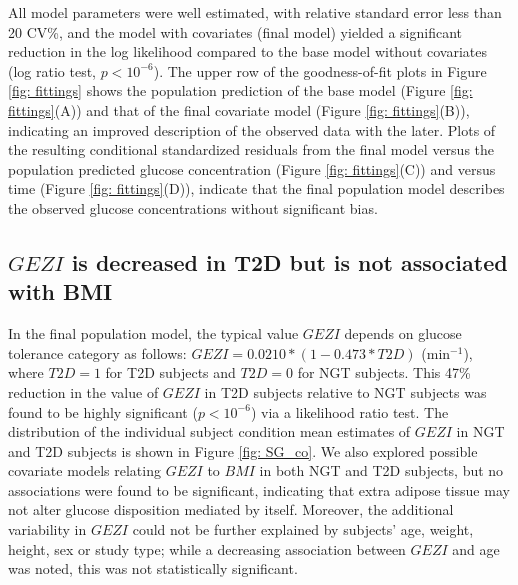 \documentclass[utf8]{frontiersSCNS} %
\begin{document}
All model parameters were well estimated, with relative standard error less than 20 CV\%, and the model with covariates (final model) yielded a significant reduction in the log likelihood compared to the base model without covariates (log ratio test, $p<10^{-6}$). The upper row of the goodness-of-fit plots in Figure \ref{fig: fittings} shows the population prediction of the base model (Figure \ref{fig: fittings}(A)) and that of the final covariate model (Figure \ref{fig: fittings}(B)), indicating an improved description of the observed data with the later. Plots of the resulting conditional standardized residuals from the final model versus the population predicted glucose concentration (Figure \ref{fig: fittings}(C)) and versus time (Figure \ref{fig: fittings}(D)), indicate that the final population model describes the observed glucose concentrations without significant bias.

\vskip 0.5cm
\subsection{$GEZI$ is decreased in T2D but is not associated with BMI}
In the final population model, the typical value $GEZI$ depends on glucose tolerance category as follows: $GEZI=0.0210*(1-0.473*T2D)$ (min$^{-1}$), where $T2D=1$ for T2D subjects and $T2D=0$ for NGT subjects. This 47\% reduction in the value of $GEZI$ in T2D subjects relative to NGT subjects was found to be highly significant ($p<10^{-6}$) via a likelihood ratio test. The distribution of the individual subject condition mean estimates of $GEZI$ in NGT and T2D subjects is shown in Figure \ref{fig: SG_co}. We also explored possible covariate models relating $GEZI$ to $BMI$ in both NGT and T2D subjects, but no associations were found to be significant, indicating that extra adipose tissue may not alter glucose disposition mediated by itself. Moreover, the additional variability in $GEZI$ could not be further explained by subjects’ age, weight, height, sex or study type; while a decreasing association between $GEZI$ and age was noted, this was not statistically significant.

\vskip 0.5cm
\end{document}
